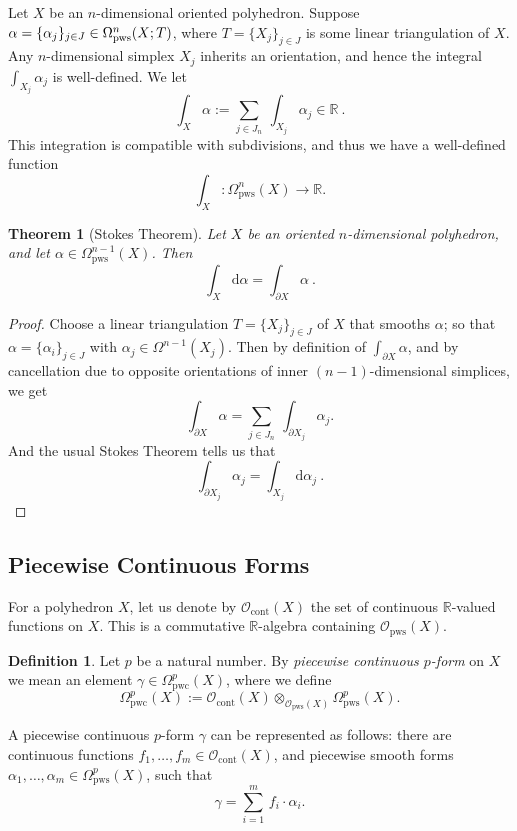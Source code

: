 \documentclass[10pt, a4paper]{amsart}
\newtheorem{thm}[equation]{Theorem}
\theoremstyle{definition}
\newtheorem{dfn}[equation]{Definition}
\numberwithin{equation}{section}
\newcommand{\mcal}[1]{\mathcal{#1}}
\newcommand{\mrm}[1]{\mathrm{#1}}
\newcommand{\mbb}[1]{\mathbb{#1}}
\newcommand{\R}{\mbb{R}}
\renewcommand{\d}{\mrm{d}}
\newcommand{\lb}{\linebreak}
\begin{document}
Let $X$ be an $n$-dimensional oriented polyhedron. Suppose 
$\alpha = \{ \alpha_j \}_{j \in J} \lb \in 
\Omega^n_{\mrm{pws}}(X; T)$,
where $T = \{ X_j \}_{j \in J}$ is some linear
triangulation of $X$. Any $n$-dimen\-sional simplex $X_j$ inherits an
orientation, and hence the integral 
$\int_{X_j} \alpha_j$ is  well-defined. We let 
\[ \int_{X} \alpha := \sum_{j \in J_n } \
\int_{X_j} \alpha_j \in \R \ .  \]
This integration is compatible with subdivisions, and thus we have a
well-defined function
\[ \int_{X} : \Omega^n_{\mrm{pws}}(X) \to \R . \]

\begin{thm}[Stokes Theorem] \label{thm:15}
Let $X$ be an oriented $n$-dimensional polyhedron, and let
$\alpha \in \Omega^{n-1}_{\mrm{pws}}(X)$.
Then
\[ \int_{X} \d \alpha = \int_{\partial X} \alpha \ . \]
\end{thm}

\begin{proof}
Choose a linear triangulation $T = \{ X_j \}_{j \in J}$ of $X$ that smooths
$\alpha$; so that 
$\alpha = \{ \alpha_i \}_{j \in J}$ with
$\alpha_j \in \Omega^{n-1}(X_j)$.
Then by definition of $\int_{\partial X} \alpha$, and by cancellation due to
opposite orientations of inner $(n-1)$-dimensional simplices, we get
\[ \int_{\partial X} \alpha = 
\sum_{j \in J_n} \ \int_{\partial X_j} \alpha_j . \]
And the usual Stokes Theorem tells us that
\[ \int_{\partial X_j} \alpha_j = \int_{X_j} \d \alpha_j \ . \]
\end{proof}



\subsection{Piecewise Continuous Forms} \label{subsec:pwc}
For a polyhedron $X$, let us denote by $\mcal{O}_{\mrm{cont}}(X)$ the set of
continuous $\R$-valued functions on $X$. This is a commutative $\R$-algebra
containing $\mcal{O}_{\mrm{pws}}(X)$.

\begin{dfn} \label{dfn:40}
Let $p$ be a natural number. By {\em piecewise continuous $p$-form} on $X$ we
mean an element 
$\gamma \in \Omega^p_{\mrm{pwc}}(X)$, where we define
\[ \Omega^p_{\mrm{pwc}}(X) :=
\mcal{O}_{\mrm{cont}}(X) \otimes_{\mcal{O}_{\mrm{pws}}(X)}
\Omega^p_{\mrm{pws}}(X) . \]
\end{dfn}

A piecewise continuous $p$-form $\gamma$ can be represented as follows:
there are continuous functions
$f_1, \ldots, f_m \in \mcal{O}_{\mrm{cont}}(X)$,
and piecewise smooth forms
$\alpha_1, \ldots, \alpha_m \in \Omega^p_{\mrm{pws}}(X)$,
such that 
\begin{equation} \label{eqn:220}
\gamma = \sum_{i = 1}^m \, f_i \cdot \alpha_i .
\end{equation}
\end{document}
